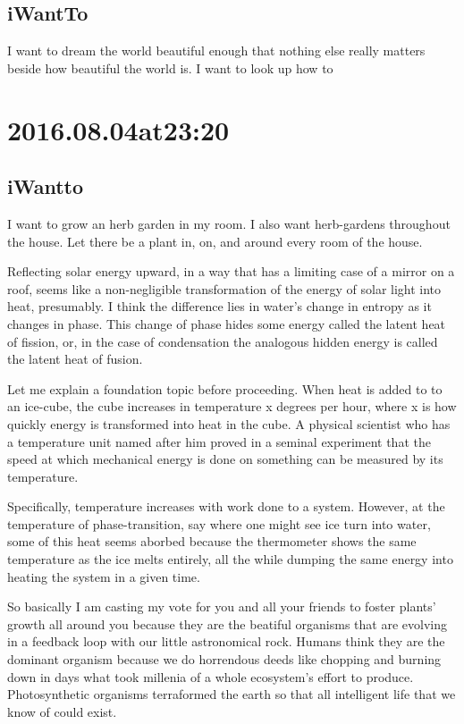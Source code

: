 \begin{enumerate}
\begin{enumerate}
\subsection*{ iWantTo }
I want to dream the world beautiful enough that nothing else really matters beside how beautiful the world is. I want to look up how to 

\section*{ 2016.08.04at23:20 }
\subsection*{ iWantto }
I want to grow an herb garden in my room. I also want herb-gardens throughout the house. Let there be a plant in, on, and around every room of the house.

Reflecting solar energy upward, in a way that has a limiting case of a mirror on a roof, seems like a non-negligible transformation of the energy of solar light into heat, presumably. I think the difference lies in water's change in entropy as it changes in phase. This change of phase hides some energy called the latent heat of fission, or, in the case of condensation the analogous hidden energy is called the latent heat of fusion.

Let me explain a foundation topic before proceeding. When heat is added to to an ice-cube, the cube increases in temperature x degrees per hour, where x is how quickly energy is transformed into heat in the cube. A physical scientist who has a temperature unit named after him proved in a seminal experiment that the speed at which mechanical energy is done on something can be measured by its temperature.

Specifically, temperature increases with work done to a system. However, at the temperature of phase-transition, say where one might see ice turn into water, some of this heat seems aborbed because the thermometer shows the same temperature as the ice melts entirely, all the while dumping the same energy into heating the system in a given time. 

So basically I am casting my vote for you and all your friends to foster plants' growth all around you because they are the beatiful organisms that are evolving in a feedback loop with our little astronomical rock. Humans think they are the dominant organism because we do horrendous deeds like chopping and burning down in days what took millenia of a whole ecosystem's effort to produce. Photosynthetic organisms terraformed the earth so that all intelligent life that we know of could exist.


\end{enumerate}
\end{enumerate}
